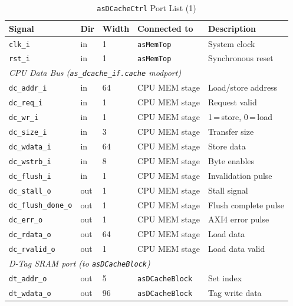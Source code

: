 \begin{table}[H]
\caption{\texttt{asDCacheCtrl} Port List (1)}
\label{tab:asDCacheCtrlPorts}
\centering
\begin{tabularx}{\textwidth}{|l |l |l |l |X|}
  \hline
  Signal & Dir & Width & Connected to & Description \\
  \hline
  \hline
  \texttt{clk\_i}  & in & 1 & \texttt{asMemTop} & System clock \\
  \hline
  \texttt{rst\_i}  & in & 1 & \texttt{asMemTop} & Synchronous reset \\
  \hline
  \multicolumn{5}{|l|}{\textit{CPU Data Bus (\texttt{as\_dcache\_if.cache} modport)}} \\
  \hline
  \texttt{dc\_addr\_i}        & in  & 64 & CPU MEM stage & Load/store address \\
  \hline
  \texttt{dc\_req\_i}         & in  & 1  & CPU MEM stage & Request valid \\
  \hline
  \texttt{dc\_wr\_i}          & in  & 1  & CPU MEM stage & 1\,=\,store, 0\,=\,load \\
  \hline
  \texttt{dc\_size\_i}        & in  & 3  & CPU MEM stage & Transfer size \\
  \hline
  \texttt{dc\_wdata\_i}       & in  & 64 & CPU MEM stage & Store data \\
  \hline
  \texttt{dc\_wstrb\_i}       & in  & 8  & CPU MEM stage & Byte enables \\
  \hline
  \texttt{dc\_flush\_i}       & in  & 1  & CPU MEM stage & Invalidation pulse \\
  \hline
  \texttt{dc\_stall\_o}       & out & 1  & CPU MEM stage & Stall signal \\
  \hline
  \texttt{dc\_flush\_done\_o} & out & 1  & CPU MEM stage & Flush complete pulse \\
  \hline
  \texttt{dc\_err\_o}         & out & 1  & CPU MEM stage & AXI4 error pulse \\
  \hline
  \texttt{dc\_rdata\_o}       & out & 64 & CPU MEM stage & Load data \\
  \hline
  \texttt{dc\_rvalid\_o}      & out & 1  & CPU MEM stage & Load data valid \\
  \hline
  \multicolumn{5}{|l|}{\textit{D-Tag SRAM port (to \texttt{asDCacheBlock})}} \\
  \hline
  \texttt{dt\_addr\_o}  & out & 5   & \texttt{asDCacheBlock} & Set index \\
  \hline
  \texttt{dt\_wdata\_o} & out & 96  & \texttt{asDCacheBlock} & Tag write data \\

\end{tabularx}
\end{table}
